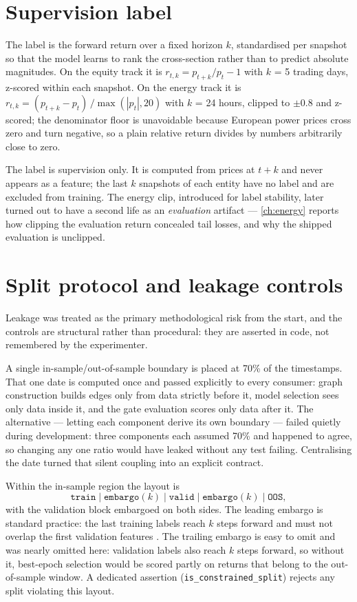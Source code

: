\section{Supervision label}
\label{sec:label}

The label is the forward return over a fixed horizon $k$, standardised
per snapshot so that the model learns to rank the cross-section rather
than to predict absolute magnitudes. On the equity track it is
$r_{t,k} = p_{t+k}/p_t - 1$ with $k$ = 5 trading days, z-scored within
each snapshot. On the energy track it is
$r_{t,k} = (p_{t+k}-p_t)\,/\max(|p_t|, 20)$ with $k$ = 24 hours, clipped
to $\pm 0.8$ and z-scored; the denominator floor is unavoidable because
European power prices cross zero and turn negative, so a plain relative
return divides by numbers arbitrarily close to zero.

The label is supervision only. It is computed from prices at $t+k$ and
never appears as a feature; the last $k$ snapshots of each entity have no
label and are excluded from training. The energy clip, introduced for
label stability, later turned out to have a second life as an
\emph{evaluation} artifact --- \cref{ch:energy} reports how clipping the
evaluation return concealed tail losses, and why the shipped evaluation
is unclipped.

\section{Split protocol and leakage controls}
\label{sec:splits}

Leakage was treated as the primary methodological risk from the start,
and the controls are structural rather than procedural: they are asserted
in code, not remembered by the experimenter.

A single in-sample/out-of-sample boundary is placed at 70\% of the
timestamps. That one date is computed once and passed explicitly to every
consumer: graph construction builds edges only from data strictly before
it, model selection sees only data inside it, and the gate evaluation
scores only data after it. The alternative --- letting each component
derive its own boundary --- failed quietly during development: three
components each assumed 70\% and happened to agree, so changing any one
ratio would have leaked without any test failing. Centralising the date
turned that silent coupling into an explicit contract.

Within the in-sample region the layout is
\[
\texttt{train} \;\big|\; \texttt{embargo}(k) \;\big|\; \texttt{valid}
\;\big|\; \texttt{embargo}(k) \;\big|\; \texttt{OOS},
\]
with the validation block embargoed on both sides. The leading
embargo is standard practice: the last training labels reach $k$ steps
forward and must not overlap the first validation features
\cite{lopezdeprado2018afml}. The trailing embargo is easy to omit and
was nearly omitted here: validation labels also reach $k$ steps forward,
so without it, best-epoch selection would be scored partly on returns
that belong to the out-of-sample window. A dedicated assertion
(\texttt{is\_constrained\_split}) rejects any split violating this
layout.

